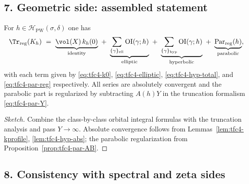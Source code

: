 \subsection*{7. Geometric side: assembled statement}\relax\hspace{0pt}
\label{subsec:tfc4-assembled} %

\begin{theorem}\relax\hspace{0pt}
\label{thm:tfc4-geom}\relax\hspace{0pt}
For $h\in\mathcal{H}_{\mathrm{PW}}(\sigma,\delta)$ one has
\begin{equation}\relax\hspace{0pt}
\label{eq:tfc4-geom-exp}\relax\hspace{0pt}
\Tr_{\mathrm{reg}}(K_h)\ =\ \underbrace{\vol(X)\,k_h(0)}_{\text{\rm identity}}\ +\ \underbrace{\sum_{\{\gamma\}_{\mathrm{ell}}}\mathrm{OI}(\gamma;h)}_{\text{\rm elliptic}}\ +\ \underbrace{\sum_{\{\gamma\}_{\mathrm{hyp}}}\mathrm{OI}(\gamma;h)}_{\text{\rm hyperbolic}}\ +\ \underbrace{\mathrm{Par}_{\mathrm{reg}}(h)}_{\text{\rm parabolic}},
\end{equation}
with each term given by \eqref{eq:tfc4-k0}, \eqref{eq:tfc4-elliptic}, \eqref{eq:tfc4-hyp-total}, and \eqref{eq:tfc4-par-reg} respectively. \relax\hspace{0pt}
All series are absolutely convergent and the parabolic part is regularized by subtracting $A(h)Y$ in the truncation formalism \eqref{eq:tfc4-par-Y}. \relax\hspace{0pt}
\end{theorem}

\begin{proof}[Sketch]\relax\hspace{0pt}
Combine the class-by-class orbital integral formulas with the truncation analysis and pass $Y\to\infty$. \relax\hspace{0pt}
Absolute convergence follows from Lemmas~\ref{lem:tfc4-kprofile}, \ref{lem:tfc4-hyp-abs}; the parabolic regularization from Proposition~\ref{prop:tfc4-par-AB}. \relax\hspace{0pt}
\end{proof}

\subsection*{8. Consistency with spectral and zeta sides}\relax\hspace{0pt}
\label{subsec:tfc4-consistency} %

